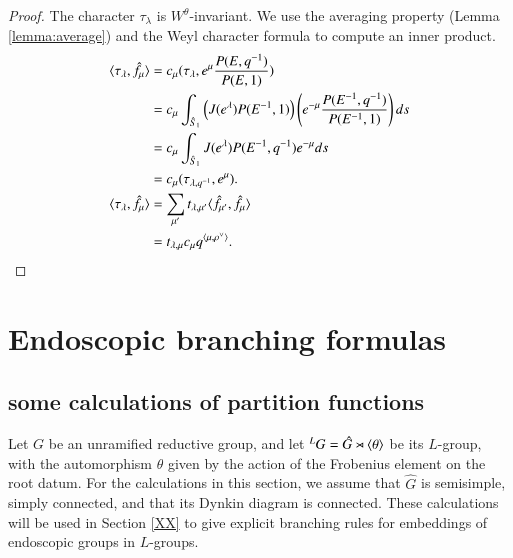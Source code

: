 \begin{proof}
The character $\tau_\lambda$ is $W^\theta$-invariant. 
We use the averaging property (Lemma \ref{lemma:average}) and the Weyl character
formula to compute an inner product.
\begin{align*}
\langle{\tau_\lambda,\hat f_\mu}\rangle
&=c_\mu(\tau_\lambda,e^\mu \frac{P(E,q^{-1})}{P(E,1)})\\
&=c_\mu\int_{\hat S_1} \left(J(e^\lambda) P(E^{-1},1)\right) \left( e^{-\mu}\frac{P(E^{-1},q^{-1})}{P(E^{-1},1)} \right) ds\\
&=
c_\mu\int_{\hat S_1} J(e^\lambda) P(E^{-1},q^{-1}) e^{-\mu} ds\\
&= c_\mu(\tau_{\lambda,q^{-1}},e^\mu).\\
\langle{\tau_\lambda,\hat f_\mu}\rangle
&=\sum_{\mu'} t_{\lambda,\mu'} \langle{\hat f_{\mu'},\hat f_\mu}\rangle \\
&= t_{\lambda,\mu} c_\mu q^{\langle{\mu,\rho^\vee}\rangle}.
\end{align*}
\end{proof}

\newpage
\section{Endoscopic branching formulas}\label{sec:branch}

\subsection{some calculations of partition functions}

Let $G$ be an unramified reductive group, and let ${}^LG = \hat G \rtimes \langle{\theta}\rangle$ be its $L$-group,
with the automorphism $\theta$ given by the action of the Frobenius element on the root datum.
For the calculations in this section, we assume that $\hat G$ is semisimple, simply connected, and that
its Dynkin diagram is connected.  These calculations will be used in Section \ref{XX} to give explicit
branching rules for embeddings of endoscopic groups in $L$-groups.

